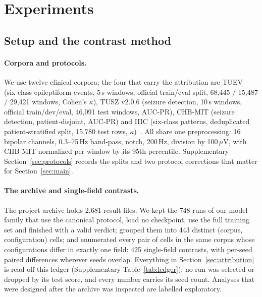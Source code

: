 \section{Experiments}
\label{sec:experiments}

\subsection{Setup and the contrast method}
\label{sec:setup}
\paragraph{Corpora and protocols.}
We use twelve clinical corpora; the four that carry the attribution are TUEV (six-class epileptiform events, 5\,s windows, official train/eval split, 68,445 / 15,487 / 29,421 windows, Cohen's $\kappa$), TUSZ v2.0.6 (seizure detection, 10\,s windows, official train/dev/eval, 46,091 test windows, AUC-PR), CHB-MIT (seizure detection, patient-disjoint, AUC-PR) and IIIC (six-class patterns, deduplicated patient-stratified split, 15,780 test rows, $\kappa$)~\cite{obeid2016temple,shah2018temple,shoeb2009application,jing2023development}. All share one preprocessing: 16 bipolar channels, 0.3--75\,Hz band-pass, notch, 200\,Hz, division by 100\,$\mu$V, with CHB-MIT normalized per window by its 95th percentile. Supplementary Section~\ref{sec:protocols} records the splits and two protocol corrections that matter for Section~\ref{sec:main}.

\paragraph{The archive and single-field contrasts.}
The project archive holds 2,681 result files. We kept the 748 runs of our model family that use the canonical protocol, load no checkpoint, use the full training set and finished with a valid verdict; grouped them into 443 distinct (corpus, configuration) cells; and enumerated every pair of cells in the same corpus whose configurations differ in exactly one field: 425 single-field contrasts, with per-seed paired differences wherever seeds overlap. Everything in Section~\ref{sec:attribution} is read off this ledger (Supplementary Table~\ref{tab:ledger}); no run was selected or dropped by its test score, and every number carries its seed count. Analyses that were designed after the archive was inspected are labelled exploratory.

